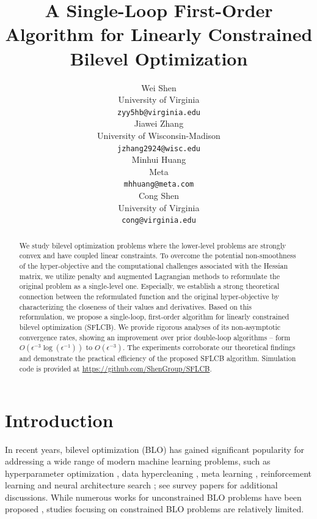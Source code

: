 \documentclass{article}
\title{A Single-Loop First-Order Algorithm for Linearly Constrained Bilevel Optimization}
\author{%
  Wei Shen\\
  University of Virginia\\
  \texttt{zyy5hb@virginia.edu} \\
  \And
    Jiawei Zhang \\
  University of Wisconsin-Madison \\
  \texttt{jzhang2924@wisc.edu} \\
  \AND
  Minhui Huang \\
  Meta \\
  \texttt{mhhuang@meta.com} \\
  \And
  Cong Shen \\
  University of Virginia\\
   \texttt{cong@virginia.edu}\\
}
\theoremstyle{plain}
\theoremstyle{definition}
\theoremstyle{remark}
\begin{document}
\maketitle


\begin{abstract}
We study bilevel optimization problems where the lower-level problems are strongly convex and have coupled linear constraints. To overcome the potential non-smoothness of the hyper-objective and the computational challenges associated with the Hessian matrix, we utilize penalty and augmented Lagrangian methods to reformulate the original problem as a single-level one. Especially, we establish a strong theoretical connection between the reformulated function and the original hyper-objective by characterizing the closeness of their values and derivatives. Based on this reformulation, we propose a single-loop, first-order algorithm for linearly constrained bilevel optimization (SFLCB). We provide rigorous analyses of its non-asymptotic convergence rates, showing an improvement over prior double-loop algorithms -- form $O(\epsilon^{-3}\log(\epsilon^{-1}))$ to $O(\epsilon^{-3})$. The experiments corroborate our theoretical findings and demonstrate the practical efficiency of the proposed SFLCB algorithm. Simulation code is provided at \url{https://github.com/ShenGroup/SFLCB}.
\end{abstract}

\section{Introduction}
\label{section: introduction}

In recent years, bilevel optimization (BLO) has gained significant popularity for addressing a wide range of modern machine learning problems, such as hyperparameter optimization \citep{pedregosa2016hyperparameter, franceschi2018bilevel, mackay2019self}, data hypercleaning \citep{shaban2019truncated}, meta learning \citep{rajeswaran2019meta, ji2020convergence}, reinforcement learning \citep{sutton2018reinforcement,hong2023two} and neural architecture search \citep{liu2018darts, liang2019darts+}; see survey papers \citep{zhang2024introduction,liu2021investigating,sinha2017review} for additional discussions. While numerous works for unconstrained BLO problems have been proposed \citep{ghadimi2018approximation, liu2020generic, ji2021bilevel, dagreou2022framework, hong2023two, kwon2023fully}, studies focusing on {constrained} BLO problems are relatively limited.
\end{document}
